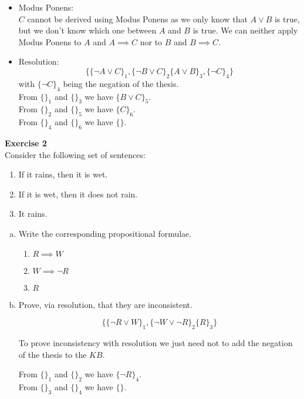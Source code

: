 \documentclass{article}
\begin{document}
\begin{itemize}
    \item Modus Ponens: \\
    $C$ cannot be derived using Modus Ponens as we only know that $A \lor B$ is true, but we don't know which one between $A$ and $B$ is true. We can neither apply Modus Ponens to $A$ and $A \implies C$ nor to $B$ and $B \implies C$.
    \item Resolution: \\
    \begin{equation*}
        \{ \{\neg A \lor C\}_1, \{\neg B \lor C\}_2 \{ A \lor B\}_3, \{ \neg C\}_4\}
    \end{equation*}
    with $\{\neg C\}_4$ being the negation of the thesis. \\

    From $\{\}_1$ and $\{\}_3$ we have $\{B \lor C\}_5$. \\
    From $\{\}_2$ and $\{\}_5$ we have $\{C\}_6$. \\
    From $\{\}_4$ and $\{\}_6$ we have $\{\}$. \\
\end{itemize}

\newpage

\textbf{Exercise 2} \\

Consider the following set of sentences:
\begin{enumerate}
    \item If it rains, then it is wet.
    \item If it is wet, then it does not rain.
    \item It rains.
\end{enumerate}

\begin{enumerate}[(a)] %
    \item Write the corresponding propositional formulae.

        \begin{enumerate}
            \item $R \implies W$
            \item $W \implies \neg R$
            \item $R$
        \end{enumerate}
    
    \item Prove, via resolution, that they are inconsistent.

    \begin{equation*}
        \{ \{\neg R \lor W\}_1, \{\neg W \lor \neg R\}_2 \{ R\}_3\}
    \end{equation*}

    To prove inconsistency with resolution we just need not to add the negation of the thesis to the $KB$.

    From $\{\}_1$ and $\{\}_2$ we have $\{\neg R\}_4$. \\
    From $\{\}_3$ and $\{\}_4$ we have $\{\}$. \\
    
\end{enumerate}
\end{document}
